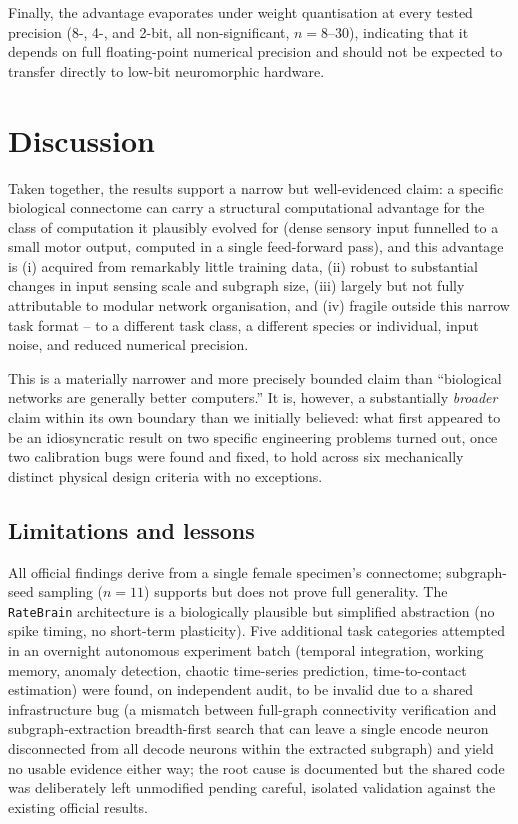 \documentclass[11pt]{article}
\begin{document}
Finally, the advantage evaporates under weight quantisation at every
tested precision (8-, 4-, and 2-bit, all non-significant, $n=8$--$30$),
indicating that it depends on full floating-point numerical precision
and should not be expected to transfer directly to low-bit neuromorphic
hardware.

\section{Discussion}

Taken together, the results support a narrow but well-evidenced claim:
a specific biological connectome can carry a structural computational
advantage for the class of computation it plausibly evolved for (dense
sensory input funnelled to a small motor output, computed in a single
feed-forward pass), and this advantage is (i) acquired from remarkably
little training data, (ii) robust to substantial changes in input
sensing scale and subgraph size, (iii) largely but not fully attributable
to modular network organisation, and (iv) fragile outside this narrow
task format -- to a different task class, a different species or
individual, input noise, and reduced numerical precision.

This is a materially narrower and more precisely bounded claim than
``biological networks are generally better computers.'' It is, however,
a substantially \emph{broader} claim within its own boundary than we
initially believed: what first appeared to be an idiosyncratic result on
two specific engineering problems turned out, once two calibration bugs
were found and fixed, to hold across six mechanically distinct physical
design criteria with no exceptions.

\subsection{Limitations and lessons}
\label{sec:limits}

All official findings derive from a single female specimen's connectome;
subgraph-seed sampling ($n=11$) supports but does not prove full
generality. The \texttt{RateBrain} architecture is a biologically
plausible but simplified abstraction (no spike timing, no short-term
plasticity). Five additional task categories attempted in an
overnight autonomous experiment batch (temporal integration, working
memory, anomaly detection, chaotic time-series prediction, time-to-contact
estimation) were found, on independent audit, to be invalid due to a
shared infrastructure bug (a mismatch between full-graph connectivity
verification and subgraph-extraction breadth-first search that can leave
a single encode neuron disconnected from all decode neurons within the
extracted subgraph) and yield no usable evidence either way; the root
cause is documented but the shared code was deliberately left unmodified
pending careful, isolated validation against the existing official
results.
\end{document}
